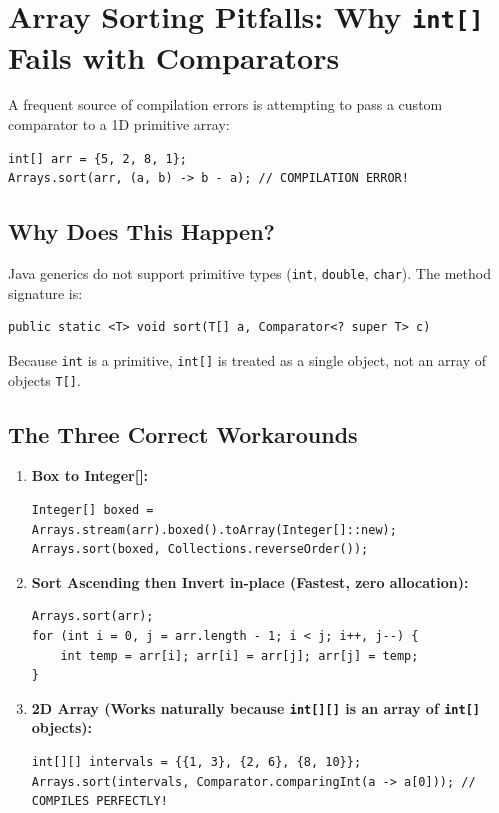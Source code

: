 \documentclass[10pt,journal,compsoc,onecolumn]{IEEEtran}
\begin{document}
\section{Array Sorting Pitfalls: Why \texttt{int[]} Fails with Comparators}
\label{sec:arrays}

A frequent source of compilation errors is attempting to pass a custom comparator to a 1D primitive array:
\begin{verbatim}
int[] arr = {5, 2, 8, 1};
Arrays.sort(arr, (a, b) -> b - a); // COMPILATION ERROR!
\end{verbatim}

\subsection{Why Does This Happen?}
Java generics do not support primitive types (\texttt{int}, \texttt{double}, \texttt{char}). The method signature is:
\begin{verbatim}
public static <T> void sort(T[] a, Comparator<? super T> c)
\end{verbatim}
Because \texttt{int} is a primitive, \texttt{int[]} is treated as a single object, not an array of objects \texttt{T[]}.

\subsection{The Three Correct Workarounds}
\begin{enumerate}
    \item \textbf{Box to Integer[]:}
\begin{verbatim}
Integer[] boxed = Arrays.stream(arr).boxed().toArray(Integer[]::new);
Arrays.sort(boxed, Collections.reverseOrder());
\end{verbatim}
    \item \textbf{Sort Ascending then Invert in-place (Fastest, zero allocation):}
\begin{verbatim}
Arrays.sort(arr);
for (int i = 0, j = arr.length - 1; i < j; i++, j--) {
    int temp = arr[i]; arr[i] = arr[j]; arr[j] = temp;
}
\end{verbatim}
    \item \textbf{2D Array (Works naturally because \texttt{int[][]} is an array of \texttt{int[]} objects):}
\begin{verbatim}
int[][] intervals = {{1, 3}, {2, 6}, {8, 10}};
Arrays.sort(intervals, Comparator.comparingInt(a -> a[0])); // COMPILES PERFECTLY!
\end{verbatim}
\end{enumerate}
\end{document}
